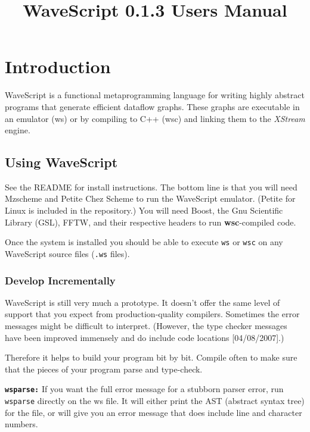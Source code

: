 \documentclass[twocolumn]{report}
\title{WaveScript 0.1.3 Users Manual}
\begin{document}
\maketitle


\tableofcontents
\clearpage

\chapter{Introduction}

WaveScript is a functional metaprogramming language for writing highly abstract
programs that generate efficient dataflow graphs.  These graphs are
executable in an emulator (ws) or by compiling to C++ (wsc) and linking them
to the {\em XStream} engine.

\section{Using WaveScript}

See the README for install instructions.  The bottom line is that you
will need Mzscheme and Petite Chez Scheme to run the WaveScript
emulator.  (Petite for Linux is included in the repository.)  You will
need Boost, the Gnu Scientific Library (GSL), FFTW, and their
respective headers to run {\bf wsc}-compiled code.

Once the system is installed you should be able to execute {\tt ws} or
{\tt wsc} on any WaveScript source files ({\tt .ws} files).

\subsection*{Develop Incrementally}

WaveScript is still very much a prototype.  It doesn't offer the same
level of support that you expect from production-quality
compilers.  Sometimes the error messages might be difficult to
interpret.  (However, the type checker messages have been improved
immensely and do include code locations [04/08/2007].)

Therefore it helps to build your program bit by bit.  Compile often to make
sure that the pieces of your program parse and type-check.

{\tt \bf wsparse:}
If you want the full error message for a stubborn parser error, run
{\tt wsparse} directly on the ws file.  It will either print the AST
(abstract syntax tree) for the file, or will give you an error message
that does include line and character numbers.
\end{document}
